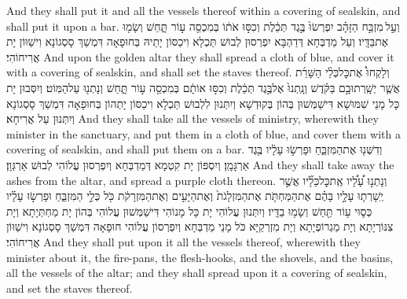 {And they shall put it and all the vessels thereof within a covering of sealskin, and shall put it upon a bar.}{}
{וְעַ֣ל \legarmeh  מִזְבַּ֣ח הַזָּהָ֗ב יִפְרְשׂוּ֙ בֶּ֣גֶד תְּכֵ֔לֶת וְכִסּ֣וּ אֹת֔וֹ בְּמִכְסֵ֖ה ע֣וֹר תָּ֑חַשׁ וְשָׂמ֖וּ אֶת\maqqaf בַּדָּֽיו׃}
{וְעַל מַדְבְּחָא דְּדַהְבָּא יִפְרְסוּן לְבוּשׁ תַּכְלָא וִיכַסּוֹן יָתֵיהּ בְּחוּפָאָה דִּמְשַׁךְ סָסְגוֹנָא וִישַׁוּוֹן יָת אֲרִיחוֹהִי׃}
{And upon the golden altar they shall spread a cloth of blue, and cover it with a covering of sealskin, and shall set the staves thereof.}{}
{וְלָקְחוּ֩ אֶת\maqqaf כׇּל\maqqaf כְּלֵ֨י הַשָּׁרֵ֜ת אֲשֶׁ֧ר יְשָֽׁרְתוּ\maqqaf בָ֣ם בַּקֹּ֗דֶשׁ וְנָֽתְנוּ֙ אֶל\maqqaf בֶּ֣גֶד תְּכֵ֔לֶת וְכִסּ֣וּ אוֹתָ֔ם בְּמִכְסֵ֖ה ע֣וֹר תָּ֑חַשׁ וְנָתְנ֖וּ עַל\maqqaf הַמּֽוֹט׃}
{וְיִסְּבוּן יָת כָּל מָנֵי שִׁמּוּשָׁא דִּישַׁמְּשׁוּן בְּהוֹן בְּקוּדְשָׁא וְיִתְּנוּן לִלְבוּשׁ תַּכְלָא וִיכַסּוֹן יָתְהוֹן בְּחוּפָאָה דִּמְשַׁךְ סָסְגוֹנָא וְיִתְּנוּן עַל אֲרִיחָא׃}
{And they shall take all the vessels of ministry, wherewith they minister in the sanctuary, and put them in a cloth of blue, and cover them with a covering of sealskin, and shall put them on a bar.}{}
{וְדִשְּׁנ֖וּ אֶת\maqqaf הַמִּזְבֵּ֑חַ וּפָרְשׂ֣וּ עָלָ֔יו בֶּ֖גֶד אַרְגָּמָֽן׃}
{וְיִסְפּוֹן יָת קִטְמָא דְּמַדְבְּחָא וְיִפְרְסוּן עֲלוֹהִי לְבוּשׁ אַרְגְּוָן׃}
{And they shall take away the ashes from the altar, and spread a purple cloth thereon.}{}
{וְנָתְנ֣וּ עָ֠לָ֠יו אֶֽת\maqqaf כׇּל\maqqaf כֵּלָ֞יו אֲשֶׁ֣ר יְֽשָׁרְת֧וּ עָלָ֣יו בָּהֶ֗ם אֶת\maqqaf הַמַּחְתֹּ֤ת אֶת\maqqaf הַמִּזְלָגֹת֙ וְאֶת\maqqaf הַיָּעִ֣ים וְאֶת\maqqaf הַמִּזְרָקֹ֔ת כֹּ֖ל כְּלֵ֣י הַמִּזְבֵּ֑חַ וּפָרְשׂ֣וּ עָלָ֗יו כְּס֛וּי ע֥וֹר תַּ֖חַשׁ וְשָׂמ֥וּ בַדָּֽיו׃}
{וְיִתְּנוּן עֲלוֹהִי יָת כָּל מָנוֹהִי דִּישַׁמְּשׁוּן עֲלוֹהִי בְּהוֹן יָת מַחְתְּיָתָא וְיָת צִנּוֹרְיָתָא וְיָת מַגְרוֹפְיָתָא וְיָת מִזְרְקַיָּא כֹּל מָנֵי מַדְבְּחָא וְיִפְרְסוֹן עֲלוֹהִי חוּפָאָה דִּמְשַׁךְ סָסְגוֹנָא וִישַׁוּוֹן אֲרִיחוֹהִי׃}
{And they shall put upon it all the vessels thereof, wherewith they minister about it, the fire-pans, the flesh-hooks, and the shovels, and the basins, all the vessels of the altar; and they shall spread upon it a covering of sealskin, and set the staves thereof.}{}
